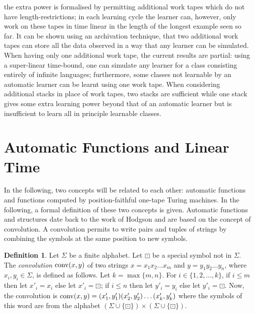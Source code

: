 \documentclass{LMCS}
\theoremstyle{plain}\newtheorem{athm}[thm]{Theorem}
\theoremstyle{plain}\newtheorem{aprop}[thm]{Proposition}
\theoremstyle{plain}\newtheorem{aprob}[thm]{Open Problem}
\theoremstyle{plain}\newtheorem{acor}[thm]{Corollary}
\theoremstyle{plain}\newtheorem{alem}[thm]{Lemma}
\theoremstyle{definition}\newtheorem{adefn}[thm]{Definition}
\theoremstyle{definition}\newtheorem{arem}[thm]{Remark}
\theoremstyle{plain}\newtheorem{aexmp}[thm]{Example}
\theoremstyle{plain}\newtheorem{aclm}[thm]{Claim}
\def\conv{{\rm{conv}}}
\begin{document}
the extra power is formalised by permitting additional work tapes
which do not have length-restrictions; in each learning cycle the learner can,
however, only work on these tapes in time linear in the length of the
longest example seen so far. It can be shown using an archivation
technique, that two additional work tapes can store all the data observed in
a way that any learner can be simulated. When having only one
additional work tape, the current results are partial: using
a super-linear time-bound, one can simulate
any learner for a class consisting entirely of infinite languages;
furthermore, some classes not learnable by an automatic learner
can be learnt using one work tape. When considering additional
stacks in place of work tapes, two stacks are sufficient while one stack
gives some extra learning power beyond that of an automatic learner
but is insufficient to learn all in principle learnable classes.


\section{Automatic Functions and Linear Time} \label{se:autofuncchar}

\noindent
In the following, two concepts will be related to each other:
automatic functions and functions computed by position-faithful
one-tape Turing machines. In the following, a formal definition
of these two concepts is given. Automatic functions and structures
date back to the work of Hodgson \cite{Ho76,Ho83} and are based
on the concept of convolution. A convolution permits to write pairs
and tuples of strings by combining the symbols at the same position
to new symbols.

\begin{adefn}
\rm 
Let $\Sigma$ be a finite alphabet.
Let $\boxdot$ be a special symbol not in $\Sigma$.
The {\em convolution} $\conv(x,y)$ 
of two strings $x=x_1x_2\ldots x_m$ and $y=y_1y_2\ldots y_n$,
where $x_i,y_i \in \Sigma$,
is defined as follows. Let
$k=\max \{m,n\}$.
For $i \in \{1,2,\ldots,k\}$,
if $i \leq m$ then let $x'_i = x_i$ else let $x'_i = \boxdot$;
if $i \leq n$ then let $y'_i = y_i$ else let $y'_i = \boxdot$.
Now, the convolution is
$\conv(x,y)=(x'_1,y'_1) \linebreak[3] (x'_2,y'_2)
\linebreak[3] \ldots \linebreak[3] (x'_k,y'_k)$
where the symbols of this word are from the alphabet
$(\Sigma \cup \{\boxdot\}) \times (\Sigma \cup \{\boxdot\})$.
\end{adefn}
\end{document}
